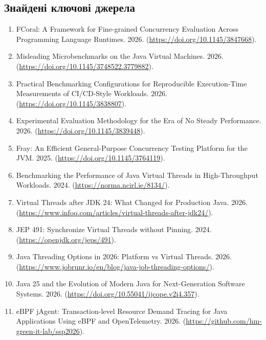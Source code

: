 \subsection{Знайдені ключові джерела}

\begin{enumerate}
    \item \foreignlanguage{english}{FCoral: A Framework for Fine-grained Concurrency Evaluation Across Programming Language Runtimes.} 2026. (\url{https://doi.org/10.1145/3847668}).
    \item \foreignlanguage{english}{Misleading Microbenchmarks on the Java Virtual Machines.} 2026. (\url{https://doi.org/10.1145/3748522.3779882}).
    \item \foreignlanguage{english}{Practical Benchmarking Configurations for Reproducible Execution-Time Measurements of CI/CD-Style Workloads.} 2026. (\url{https://doi.org/10.1145/3838807}).
    \item \foreignlanguage{english}{Experimental Evaluation Methodology for the Era of No Steady Performance.} 2026. (\url{https://doi.org/10.1145/3839448}).
    \item \foreignlanguage{english}{Fray: An Efficient General-Purpose Concurrency Testing Platform for the JVM.} 2025. (\url{https://doi.org/10.1145/3764119}).
    \item \foreignlanguage{english}{Benchmarking the Performance of Java Virtual Threads in High-Throughput Workloads.} 2024. (\url{https://norma.ncirl.ie/8134/}).
    \item \foreignlanguage{english}{Virtual Threads after JDK 24: What Changed for Production Java.} 2026. (\url{https://www.infoq.com/articles/virtual-threads-after-jdk24/}).
    \item \foreignlanguage{english}{JEP 491: Synchronize Virtual Threads without Pinning.} 2024. (\url{https://openjdk.org/jeps/491}).
    \item \foreignlanguage{english}{Java Threading Options in 2026: Platform vs Virtual Threads.} 2026. (\url{https://www.jobrunr.io/en/blog/java-job-threading-options/}).
    \item \foreignlanguage{english}{Java 25 and the Evolution of Modern Java for Next-Generation Software Systems.} 2026. (\url{https://doi.org/10.55041/ijcope.v2i4.357}).
    \item \foreignlanguage{english}{eBPF jAgent: Transaction-level Resource Demand Tracing for Java Applications Using eBPF and OpenTelemetry.} 2026. (\url{https://github.com/hm-green-it-lab/ssp2026}).
\end{enumerate}

